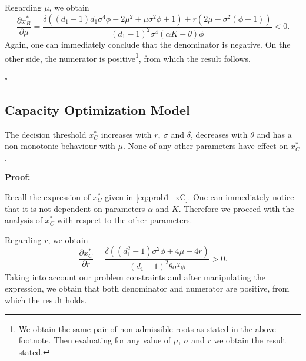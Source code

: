 Regarding $\mu$, we obtain
$$\frac{\partial x^*_B}{\partial \mu}= \frac{   \delta \left( (d_1-1) d_1 \sigma ^4 \phi -2 \mu ^2+\mu  \sigma ^2 \phi+1 \right)+r \left(2 \mu -\sigma ^2 \left(\phi+1\right)\right)}{(d_1-1)^2 \sigma ^4 (\alpha K-\theta ) \phi}<0.$$
Again, one can immediately conclude that the denominator is negative. On the other side, the numerator is positive\footnote{We obtain the same pair of non-admissible roots as stated in the above footnote. Then evaluating for any value of $\mu, \ \sigma$ and $r$ we obtain the result stated.}, from which the result follows. %
 
 
\begin{flushright}
 $\square$
\end{flushright}


\subsection{Capacity Optimization Model}

\begin{prop}
	\label{1_prop2}
The decision threshold $x^*_C$ increases with $r, \ \sigma$ and $\delta$, decreases with $\theta$ and has a non-monotonic behaviour with  $\mu$. None of any other parameters have effect on $x^*_C$.
\end{prop}

\textbf{Proof:}

Recall the expression of $x^*_C$ given in \eqref{eq:prob1_xC}. One can immediately notice that it is not dependent on parameters $\alpha$ and $K$. Therefore we proceed with the analysis of $x^*_C$ with respect to the other parameters.

Regarding $r$, we obtain
$$\frac{\partial x^*_C}{\partial r}=\frac{\delta  \left(\left(d_1^2-1\right) \sigma ^2  \phi+4 \mu -4 r\right)}{(d_1-1)^2 \theta  \sigma ^2 \phi}>0.$$
Taking into account our problem constraints and after manipulating the expression, we obtain that both denominator and numerator are positive, from which the result holds.


